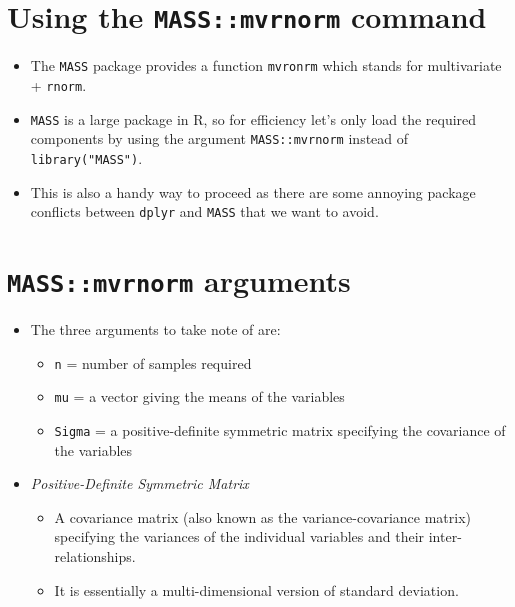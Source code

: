\documentclass[
]{article}
\providecommand{\tightlist}{%
  \setlength{\itemsep}{0pt}\setlength{\parskip}{0pt}}
\begin{document}
\hypertarget{using-the-massmvrnorm-command}{%
\section{\texorpdfstring{Using the \texttt{MASS::mvrnorm}
command}{Using the MASS::mvrnorm command}}\label{using-the-massmvrnorm-command}}

\begin{itemize}
\tightlist
\item
  The \texttt{MASS} package provides a function \texttt{mvronrm} which
  stands for multivariate + \texttt{rnorm}.
\item
  \texttt{MASS} is a large package in R, so for efficiency let's only
  load the required components by using the argument
  \texttt{MASS::mvrnorm} instead of \texttt{library("MASS")}.
\item
  This is also a handy way to proceed as there are some annoying package
  conflicts between \texttt{dplyr} and \texttt{MASS} that we want to
  avoid.
\end{itemize}

\hypertarget{massmvrnorm-arguments}{%
\section{\texorpdfstring{\texttt{MASS::mvrnorm}
arguments}{MASS::mvrnorm arguments}}\label{massmvrnorm-arguments}}

\begin{itemize}
\tightlist
\item
  The three arguments to take note of are:

  \begin{itemize}
  \tightlist
  \item
    \texttt{n} = number of samples required
  \item
    \texttt{mu} = a vector giving the means of the variables
  \item
    \texttt{Sigma} = a positive-definite symmetric matrix specifying the
    covariance of the variables
  \end{itemize}
\item
  \emph{Positive-Definite Symmetric Matrix}

  \begin{itemize}
  \tightlist
  \item
    A covariance matrix (also known as the variance-covariance matrix)
    specifying the variances of the individual variables and their
    inter-relationships.
  \item
    It is essentially a multi-dimensional version of standard deviation.
  \end{itemize}
\end{itemize}
\end{document}
